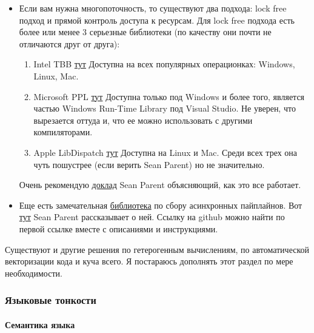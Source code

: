\documentclass{article}
\begin{document}
\begin{itemize}
\item Если вам нужна многопоточность, то существуют два подхода: lock free подход и прямой контроль доступа к ресурсам. Для lock free подхода есть более или менее 3 серьезные библиотеки (по качеству они почти не отличаются друг от друга):
\begin{enumerate}
\item Intel TBB \href{https://software.intel.com/content/www/us/en/develop/tools/oneapi/components/onetbb.html}{тут} Доступна на всех популярных операционках: Windows, Linux, Mac.
\item Microsoft PPL \href{https://docs.microsoft.com/en-us/cpp/parallel/concrt/parallel-patterns-library-ppl?view=msvc-160}{тут} Доступна только под Windows и более того, является частью Windows Run-Time Library под Visual Studio. Не уверен, что вырезается оттуда и, что ее можно использовать с другими компиляторами.
\item Apple LibDispatch \href{https://github.com/apple/swift-corelibs-libdispatch}{тут} Доступна на Linux и Mac. Среди всех трех она чуть пошустрее (если верить Sean Parent) но не значительно.
\end{enumerate}
Очень рекомендую \href{https://www.youtube.com/watch?v=QIHy8pXbneI}{доклад} Sean Parent объясняющий, как это все работает.

\item Еще есть замечательная \href{https://stlab.cc/}{библиотека} по сбору асинхронных пайплайнов. Вот \href{https://www.youtube.com/watch?v=0ZS_-G4urko}{тут} Sean Parent рассказывает о ней. Ссылку на github можно найти по первой ссылке вместе с описаниями и инструкциями.
\end{itemize}

Существуют и другие решения по гетерогенным вычислениям, по автоматической векторизации кода и куча всего. Я постараюсь дополнять этот раздел по мере необходимости.


\subsubsection{Языковые тонкости}

\paragraph{Семантика языка}
\end{document}
